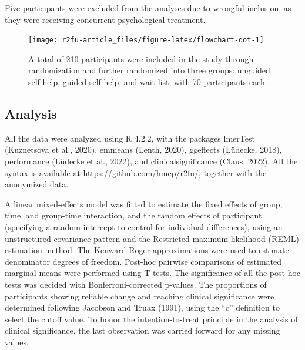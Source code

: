 \documentclass[preprint,
3p]{elsarticle} %
\begin{document}
Five participants were excluded from the analyses due to wrongful
inclusion, as they were receiving concurrent psychological treatment.

\begin{figure}
\texttt{[image: r2fu-article\_files/figure-latex/flowchart-dot-1]} \caption{A total of 210 participants were included in the study through randomization and further randomized into three groups: unguided self-help, guided self-help, and wait-list, with 70 participants each.}\label{fig:flowchart-dot}
\end{figure}

\hypertarget{analysis}{%
\subsection{Analysis}\label{analysis}}

All the data were analyzed using R 4.2.2, with the packages lmerTest
(Kuznetsova et al., 2020), emmeans (Lenth, 2020), ggeffects (Lüdecke,
2018), performance (Lüdecke et al., 2022), and clinicalsignificance
(Claus, 2022). All the syntax is available at
https://github.com/hmep/r2fu/, together with the anonymized data.

A linear mixed-effects model was fitted to estimate the fixed effects of
group, time, and group-time interaction, and the random effects of
participant (specifying a random intercept to control for individual
differences), using an unstructured covariance pattern and the
Restricted maximum likelihood (REML) estimation method. The
Kenward-Roger approximations were used to estimate denominator degrees
of freedom. Post-hoc pairwise comparisons of estimated marginal means
were performed using T-tests. The significance of all the post-hoc tests
was decided with Bonferroni-corrected p-values. The proportions of
participants showing reliable change and reaching clinical significance
were determined following Jacobson and Truax (1991), using the ``c''
definition to select the cutoff value. To honor the intention-to-treat
principle in the analysis of clinical significance, the last observation
was carried forward for any missing values.
\end{document}
